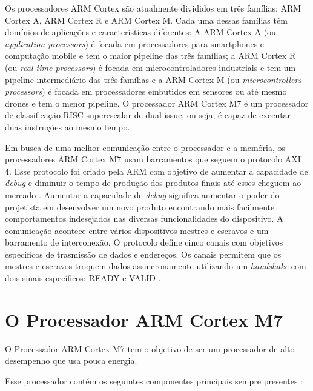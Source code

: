 \documentclass[10pt, a4paper]{article}
\begin{document}
Os processadores ARM Cortex são atualmente divididos em três famílias: ARM Cortex A, ARM Cortex R e ARM Cortex M. Cada uma dessas famílias têm domínios de aplicações e características diferentes: A ARM Cortex A (ou {\it application processors}) é focada em processadores para smartphones e computação mobile e tem o maior pipeline das três famílias; a ARM Cortex R (ou {\it real-time processors}) é focada em microcontroladores industriais e tem um pipeline intermediário das três famílias e a ARM Cortex M (ou {\it microcontrollers processors}) é focada em processadores embutidos em sensores ou até mesmo drones e tem o menor pipeline. O processador ARM Cortex M7 é um processador de classificação RISC superescalar de dual issue, ou seja, é capaz de executar duas instruções ao mesmo tempo.

Em busca de uma melhor comunicação entre o processador e a memória, os processadores ARM Cortex M7 usam barramentos que seguem o protocolo AXI 4. Esse protocolo foi criado pela ARM com objetivo de aumentar a capacidade de {\it debug} e diminuir o tempo de produção dos produtos finais até esses cheguem ao mercado \autocite{axi-experiment}. Aumentar a capacidade de {\it debug} significa aumentar o poder do projetista em desenvolver um novo produto encontrando mais facilmente comportamentos indesejados nas diversas funcionalidades do dispositivo. A comunicação acontece entre vários dispositivos mestres e escravos e um barramento de interconexão. O protocolo define cinco canais com objetivos especificos de trasmissão de dados e endereços. Os canais permitem que os mestres e escravos troquem dados assincronamente utilizando um \textit{handshake} com dois sinais específicos: READY e VALID \autocite{amba-axi-manual}.


\section{O Processador ARM Cortex M7}

O Processador ARM Cortex M7  \autocite{cortex-m7-trm} tem o objetivo de ser um processador de alto desempenho que usa pouca energia.

Esse processador contém os seguintes componentes principais sempre presentes \autocite{cortex-m7-trm}:
\end{document}
